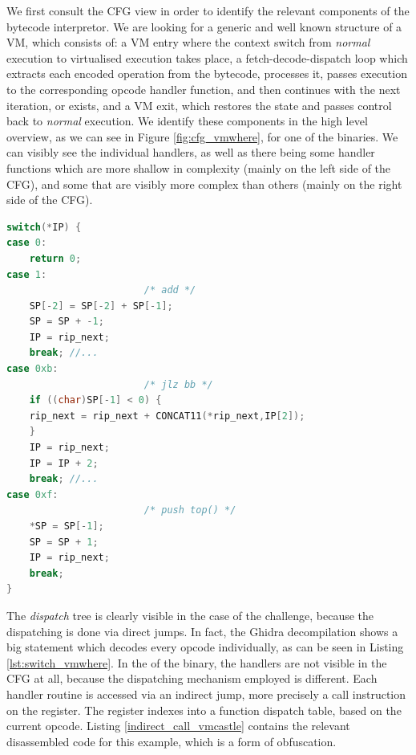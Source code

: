 We first consult the \gls{CFG} view in order to identify the relevant components of the bytecode interpretor. We are looking for a generic and well known structure of a \gls{VM}, which consists of: a \gls{VM} entry where the context switch from \emph{normal} execution to virtualised execution takes place, a fetch-decode-dispatch loop which extracts each encoded operation from the bytecode, processes it, passes execution to the corresponding opcode handler function, and then continues with the next iteration, or exists, and a \gls{VM} exit, which restores the state and passes control back to \emph{normal} execution. We identify these components in the high level overview, as we can see in Figure \ref{fig:cfg_vmwhere}, for one of the binaries. We can visibly see the individual handlers, as well as there being some handler functions which are more shallow in complexity (mainly on the left side of the \gls{CFG}), and some that are visibly more complex than others (mainly on the right side of the \gls{CFG}). 

\begin{lstlisting}[language=c, label={lst:switch_vmwhere}, caption={Decompilation section of the \cc{vmwhere} dispatcher, after variable renaming and retyping. We notice the implementation of the \cc{add}, \cc{jlz} and \cc{push_top} instructions.}]
switch(*IP) {
case 0:
    return 0;
case 1:
                        /* add */
    SP[-2] = SP[-2] + SP[-1];
    SP = SP + -1;
    IP = rip_next;
    break; //...
case 0xb:
                        /* jlz bb */
    if ((char)SP[-1] < 0) {
    rip_next = rip_next + CONCAT11(*rip_next,IP[2]);
    }
    IP = rip_next;
    IP = IP + 2;
    break; //...
case 0xf:
                        /* push top() */
    *SP = SP[-1];
    SP = SP + 1;
    IP = rip_next;
    break;
}
\end{lstlisting}

The \emph{dispatch} tree is clearly visible in the case of the  challenge, because the dispatching is done via direct jumps. In fact, the Ghidra decompilation shows a big  statement which decodes every opcode individually, as can be seen in Listing \ref{lst:switch_vmwhere}. In the of the  binary, the handlers are not visible in the \gls{CFG} at all, because the dispatching mechanism employed is different. Each handler routine is accessed via an indirect jump, more precisely a call instruction on the  register. The  register indexes into a function dispatch table, based on the current opcode. Listing \ref{indirect_call_vmcastle} contains the relevant disassembled code for this example, which is a form of obfuscation.

